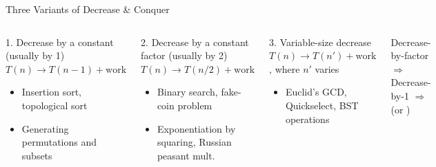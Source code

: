 \documentclass[aspectratio=169]{beamer}
\begin{document}
\begin{frame}[shrink=12]{Three Variants of Decrease \& Conquer}
  \begin{columns}[T]
      \begin{block}{1. Decrease by a constant (usually by 1)}
        $T(n) \to T(n-1) + \text{work}$
        \begin{itemize}
          \item Insertion sort, topological sort
          \item Generating permutations and subsets
        \end{itemize}
      \end{block}
      \vspace{0.3em}
      \begin{block}{2. Decrease by a constant factor (usually by 2)}
        $T(n) \to T(n/2) + \text{work}$
        \begin{itemize}
          \item Binary search, fake-coin problem
          \item Exponentiation by squaring, Russian peasant mult.
        \end{itemize}
      \end{block}
      
      \begin{block}{3. Variable-size decrease}
        $T(n) \to T(n') + \text{work}$, where $n'$ varies
        \begin{itemize}
          \item Euclid's GCD, Quickselect, BST operations
        \end{itemize}
      \end{block}
    
      \small Decrease-by-factor $\Rightarrow$ \\
      Decrease-by-1 $\Rightarrow$  (or )
  \end{columns}
\end{frame}
\end{document}
